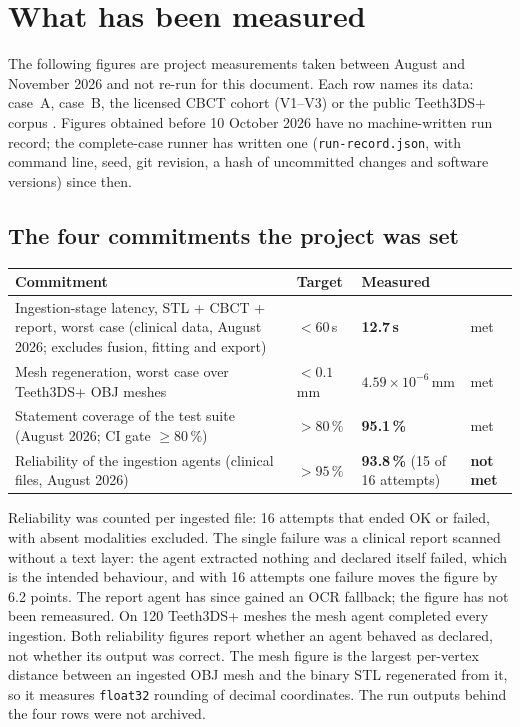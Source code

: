 \documentclass[11pt,a4paper]{article}
\newcommand{\code}[1]{\texttt{\small #1}}
\begin{document}
\section{What has been measured}\label{sec:evidence}

The following figures are project measurements taken between August and November 2026 and
not re-run for this document. Each row names its data: case~A, case~B, the licensed CBCT
cohort (V1--V3) or the public Teeth3DS+ corpus \cite{teeth3ds}. Figures obtained before
10 October 2026 have no machine-written run record; the complete-case runner has written one
(\code{run-record.json}, with command line, seed, git revision, a hash of uncommitted
changes and software versions) since then.

\subsection{The four commitments the project was set}

\begin{longtable}{L{7.2cm} L{2.4cm} L{2.4cm} L{2.4cm}}
\toprule
\textbf{Commitment} & \textbf{Target} & \textbf{Measured} & \\
\midrule
\endhead
Ingestion-stage latency, STL + CBCT + report, worst case (clinical data, August 2026;
excludes fusion, fitting and export) & $<60$\,s & \textbf{12.7\,s} & met\\
Mesh regeneration, worst case over Teeth3DS+ OBJ meshes & $<0.1$\,mm &
{\small $4.59\times10^{-6}$\,mm} & met\\
Statement coverage of the test suite (August 2026; CI gate $\geq 80\,\%$) & $>80\,\%$ &
\textbf{95.1\,\%} & met\\
Reliability of the ingestion agents (clinical files, August 2026) & $>95\,\%$ &
\textbf{93.8\,\%} (15 of 16 attempts) & \textbf{not met}\\
\bottomrule
\end{longtable}

Reliability was counted per ingested file: 16 attempts that ended OK or failed, with absent
modalities excluded. The single failure was a clinical report scanned without a text layer:
the agent extracted nothing and declared itself failed, which is the intended behaviour, and
with 16 attempts one failure moves the figure by 6.2 points. The report agent has since
gained an OCR fallback; the figure has not been remeasured. On 120 Teeth3DS+ meshes the mesh
agent completed every ingestion. Both reliability figures report whether an agent behaved as
declared, not whether its output was correct. The mesh figure is the largest per-vertex
distance between an ingested OBJ mesh and the binary STL regenerated from it, so it measures
\code{float32} rounding of decimal coordinates. The run outputs behind the four rows were not
archived.
\end{document}
